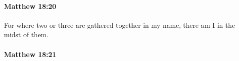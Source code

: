 		\paragraph{Matthew 18:20} %
			\label{MATTHEW-18-20}

			For where two or three are gathered together in my name, there am I in the midst of them.

			\begin{framed}
			\scriptsize
				\begin{compactdesc}
					\item[SBLG] 
				\end{compactdesc}
			\end{framed}

		\paragraph{Matthew 18:21} %
			\label{MATTHEW-18-21}

